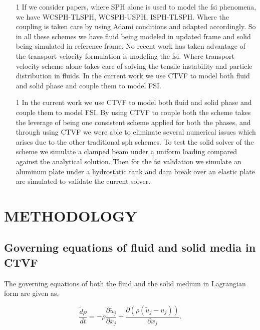 \documentclass[10pt, conference]{FMFP2022}
\begin{document}
\begin{itemize}
\item [1] If we consider papers, where SPH alone is used to model the fsi
  phenomena, we have WCSPH-TLSPH, WCSPH-USPH, ISPH-TLSPH. Where the coupling is
  taken care by using Adami conditions and adapted accordingly. So in all these
  schemes we have fluid being modeled in updated frame and solid being simulated
  in reference frame. No recent work has taken advantage of the transport
  velocity formulation is modeling the fsi. Where transport velocity scheme
  alone takes care of solving the tensile instability and particle distribution
  in fluids. In the current work we use CTVF to model both fluid and solid phase
  and couple them to model FSI.
\end{itemize}

\begin{itemize}
\item [1] In the current work we use CTVF to model both fluid and solid phase
  and couple them to model FSI. By using CTVF to couple both the scheme takes
  the leverage of being one consistent scheme applied for both the phases, and
  through using CTVF we were able to eliminate several numerical issues which
  arises due to the other traditional sph schemes. To test the solid solver of
  the scheme we simulate a clamped beam under a uniform loading compared against
  the analytical solution. Then for the fsi validation we simulate an aluminum
  plate under a hydrostatic tank and dam break over an elastic plate are
  simulated to validate the current solver.
\end{itemize}

\section{\textbf{METHODOLOGY}}\label{sec2}


\subsection{\textbf{Governing equations of fluid and solid media in CTVF}}\label{subsec:governing-eqtns}

The governing equations of both the fluid and the solid medium in Lagrangian form are given as,

\begin{equation}
  \label{eq:ce-tvf}
  \frac{\tilde{d} \rho}{d t} =
  - \rho \frac{\partial \tilde{u}_j}{\partial x_j} +
  \frac{\partial (\rho (\tilde{u}_j - u_j))}{\partial x_j}.
\end{equation}
\end{document}
